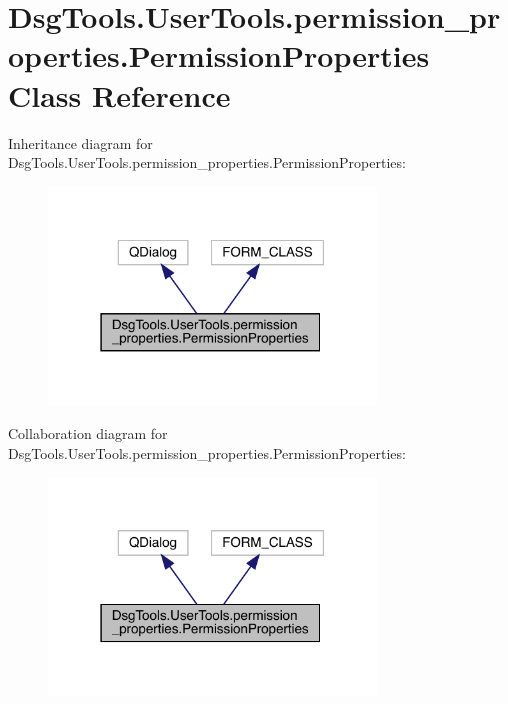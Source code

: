 \hypertarget{class_dsg_tools_1_1_user_tools_1_1permission__properties_1_1_permission_properties}{}\section{Dsg\+Tools.\+User\+Tools.\+permission\+\_\+properties.\+Permission\+Properties Class Reference}
\label{class_dsg_tools_1_1_user_tools_1_1permission__properties_1_1_permission_properties}


Inheritance diagram for Dsg\+Tools.\+User\+Tools.\+permission\+\_\+properties.\+Permission\+Properties\+:
\nopagebreak
\begin{figure}[H]
\begin{center}
\leavevmode
\includegraphics[width=247pt]{class_dsg_tools_1_1_user_tools_1_1permission__properties_1_1_permission_properties__inherit__graph}
\end{center}
\end{figure}


Collaboration diagram for Dsg\+Tools.\+User\+Tools.\+permission\+\_\+properties.\+Permission\+Properties\+:
\nopagebreak
\begin{figure}[H]
\begin{center}
\leavevmode
\includegraphics[width=247pt]{class_dsg_tools_1_1_user_tools_1_1permission__properties_1_1_permission_properties__coll__graph}
\end{center}
\end{figure}
